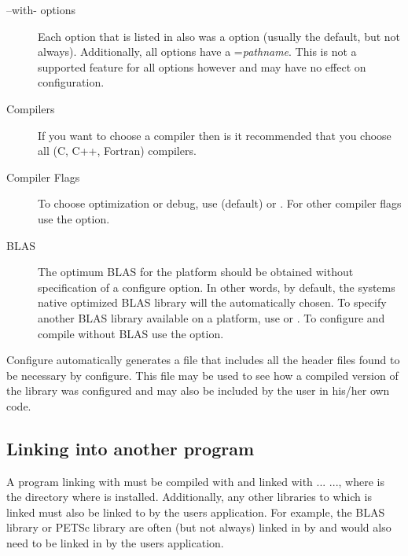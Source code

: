 \begin{description}

\item[--with- options] Each  option that is listed in
 also was a  option (usually the
default, but not always).  Additionally, all  options
have a ={\it pathname}.  This is not a
supported feature for all  options however and may have
no effect on configuration.

\item[Compilers] If you want to choose a compiler then is it recommended
that you choose all (C, C++, Fortran) compilers.

\item[Compiler Flags] To choose optimization or debug, use
 (default) or .
For other compiler flags use the  option.

\item[BLAS] The optimum BLAS for the platform should be obtained
without specification of a configure option.  In other words, by
default, the systems native optimized BLAS library will the
automatically chosen.  To specify another BLAS library available on a
platform, use  or
.  To configure and compile without
BLAS use the  option.
\end{description}

Configure automatically generates a file  that
includes all the header files found to be necessary by configure.
This file may be used to see how a compiled version of the library was
configured and may also be included by the user in his/her own code.

\subsection{Linking into another program}

A program linking with \hypre{} must be compiled with
 and linked with
... 
..., where  is the
directory where \hypre{} is installed.  Additionally, any other
libraries to which \hypre{} is linked must also be linked to by the
users application.  For example, the BLAS library or PETSc library are
often (but not always) linked in by \hypre{} and would also need to be
linked in by the users application.

